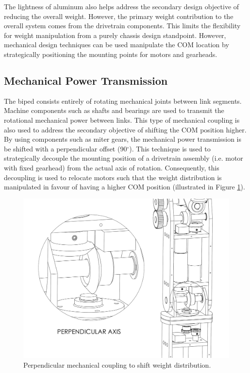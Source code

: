 The lightness of aluminum also helps address the secondary design objective of reducing the overall weight. However, the primary weight contribution to the overall system comes from the drivetrain components. This limits the flexibility for weight manipulation from a purely chassis design standpoint. However, mechanical design techniques can be used manipulate the COM location by strategically positioning the mounting points for motors and gearheads. 

\subsection{Mechanical Power Transmission} %
\label{sub:mechanical_power_transmission}
The biped consists entirely of rotating mechanical joints between link segments. Machine components such as shafts and bearings are used to transmit the rotational mechanical power between links. This type of mechanical coupling is also used to address the secondary objective of shifting the COM position higher. By using components such as miter gears, the mechanical power transmission is be shifted with a perpendicular offset (90$^\circ$). This technique is used to strategically decouple the mounting position of a drivetrain assembly (i.e. motor with fixed gearhead) from the actual axis of rotation. Consequently, this decoupling is used to relocate motors such that the weight distribution is manipulated in favour of having a higher COM position (illustrated in Figure \ref{fig:miter}).
	
\begin{figure}[!h]
	\begin{center}
    \includegraphics[scale=0.5]{fig/design/perpendicular.pdf}
	\end{center}
  \caption{Perpendicular mechanical coupling to shift weight distribution.}
\label{fig:miter}
\end{figure}

